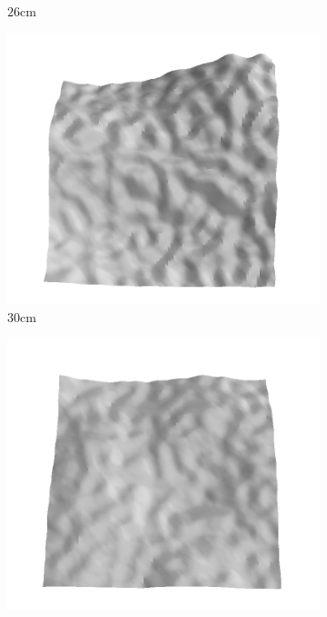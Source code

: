 \documentclass[../document.tex]{subfiles}
\begin{document}
\begin{figure}[htbp]
\begin{subfigure}[b]{0.19\textwidth}
    \caption{$26$cm}
    \end{subfigure}
    \begin{subfigure}[b]{0.19\textwidth}
    \includegraphics[width=\linewidth]{../img/5/train/all/30-patch-3d-majavi-16.png}
    \caption{$30$cm}
    \end{subfigure}
    \begin{subfigure}[b]{0.19\textwidth}
    \includegraphics[width=\linewidth]{../img/5/train/all/33-patch-3d-majavi-17.png}

\end{subfigure}
\end{figure}
\end{document}
